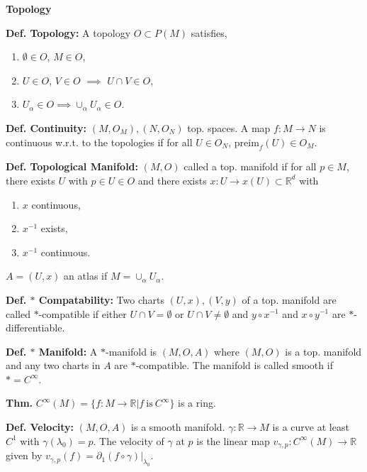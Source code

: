 \documentclass[12pt]{article}
\begin{document}
\begin{multicols}{2}
  \begin{center}
    \textbf{Topology}
  \end{center}
  
  \noindent
  \textbf{Def. Topology:} A topology $O \subset P(M)$ satisfies,
  \begin{enumerate}
  \item $\emptyset \in O$, $M \in O$,
  \item $U \in O$, $V \in O$ $\implies$ $U \cap V \in O$,
  \item $U_{\alpha} \in O \implies \cup_{\alpha} U_{\alpha} \in O$.
  \end{enumerate}
  
  \noindent
  \textbf{Def. Continuity:} $(M, O_M), (N, O_N)$ top. spaces.
  A map $f: M \rightarrow N$ is continuous w.r.t. to the topologies if for all $U \in O_N$,
  $\textrm{preim}_f(U) \in O_M$.
  
  \noindent
  \textbf{Def. Topological Manifold:} $(M, O)$ called a top. manifold if for all $p \in M$, there exists
  $U$ with $p \in U \in O$ and there exists $x: U \rightarrow x(U) \subset \mathbb{R}^d$ with
  \begin{enumerate}
  \item $x$ continuous,
  \item $x^{-1}$ exists,
  \item $x^{-1}$ continuous.
  \end{enumerate}
  $A = {(U, x)}$ an atlas if $M = \cup_{\alpha} U_{\alpha}$.
  
  \noindent
  \textbf{Def. $*$ Compatability:} Two charts $(U, x), (V, y)$ of a top. manifold are called $*$-compatible if either
  $U \cap V = \emptyset$ or $U \cap V \neq \emptyset$ and $y \circ x^{-1}$ and $x \circ y^{-1}$ are $*$-differentiable.
  
  \noindent
  \textbf{Def. $*$ Manifold:} A $*$-manifold is $(M, O, A)$ where
  $(M, O)$ is a top. manifold and any two charts in $A$ are $*$-compatible.
  The manifold is called smooth if $* = C^{\infty}$.

  \noindent
  \textbf{Thm.}
  $C^{\infty}(M) = \{f : M \rightarrow \mathbb{R} | f \ \textrm{is} \ C^{\infty}\}$ is a ring.

  \noindent
  \textbf{Def. Velocity:} $(M, O, A)$ is a smooth manifold. $\gamma : \mathbb{R} \rightarrow M$
  is a curve at least $C^{1}$ with $\gamma(\lambda_0) = p$. The velocity of $\gamma$ at $p$ is the linear map
  $v_{\gamma, p} : C^{\infty}(M) \rightarrow \mathbb{R}$ given by $v_{\gamma, p}(f) = \partial_1 (f \circ \gamma)\lvert_{\lambda_0}$.


\end{multicols}
\end{document}

